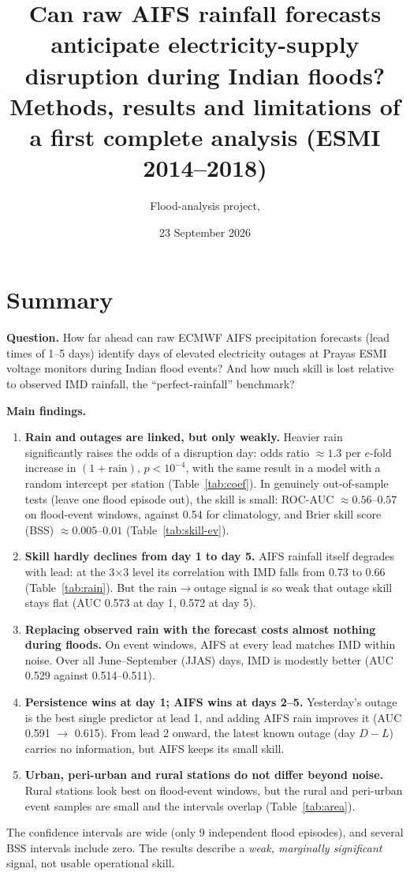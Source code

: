 \documentclass[11pt,a4paper]{article}
\title{Can raw AIFS rainfall forecasts anticipate electricity-supply disruption during Indian floods?\\[4pt]
\large Methods, results and limitations of a first complete analysis (ESMI 2014--2018)}
\author{Flood-analysis project, \code{/scratch/users/ag4680/flood\_analysis}}
\date{23 September 2026}
\begin{document}
\maketitle
\tableofcontents
\clearpage

\section{Summary}
\textbf{Question.} How far ahead can raw ECMWF AIFS precipitation forecasts (lead times of 1--5 days)
identify days of elevated electricity outages at Prayas ESMI voltage monitors during Indian flood events?
And how much skill is lost relative to observed IMD rainfall, the ``perfect-rainfall'' benchmark?

\medskip\noindent\textbf{Main findings.}
\begin{enumerate}
\item \textbf{Rain and outages are linked, but only weakly.} Heavier rain significantly raises the odds of a
disruption day: odds ratio $\approx 1.3$ per $e$-fold increase in $(1+\text{rain})$, $p<10^{-4}$, with the same
result in a model with a random intercept per station (Table~\ref{tab:coef}). In genuinely out-of-sample tests
(leave one flood episode out), the skill is small: ROC-AUC $\approx 0.56$--$0.57$ on flood-event windows,
against 0.54 for climatology, and Brier skill score (BSS) $\approx 0.005$--$0.01$ (Table~\ref{tab:skill-ev}).
\item \textbf{Skill hardly declines from day 1 to day 5.} AIFS rainfall itself degrades with lead: at the
3$\times$3 level its correlation with IMD falls from 0.73 to 0.66 (Table~\ref{tab:rain}). But the
rain$\rightarrow$outage signal is so weak that outage skill stays flat (AUC 0.573 at day 1, 0.572 at day 5).
\item \textbf{Replacing observed rain with the forecast costs almost nothing during floods.} On event windows,
AIFS at every lead matches IMD within noise. Over all June--September (JJAS) days, IMD is modestly better
(AUC 0.529 against 0.514--0.511).
\item \textbf{Persistence wins at day 1; AIFS wins at days 2--5.} Yesterday's outage is the best single
predictor at lead 1, and adding AIFS rain improves it (AUC 0.591 $\rightarrow$ 0.615). From lead 2 onward,
the latest known outage (day $D-L$) carries no information, but AIFS keeps its small skill.
\item \textbf{Urban, peri-urban and rural stations do not differ beyond noise.} Rural stations look best on
flood-event windows, but the rural and peri-urban event samples are small and the intervals overlap
(Table~\ref{tab:area}).
\end{enumerate}
\noindent The confidence intervals are wide (only 9 independent flood episodes), and several BSS intervals
include zero. The results describe a \emph{weak, marginally significant} signal, not usable operational skill.
\end{document}
